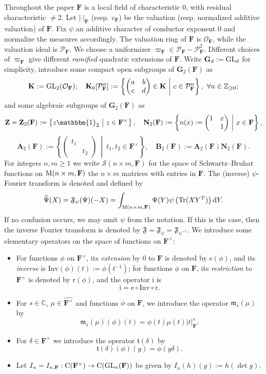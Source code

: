 \documentclass[A4]{amsart}
\def\geq{\geqslant}
\numberwithin{equation}{section} \everymath{\displaystyle}
\newcommand{\Cont}{{\rm C}}
\newcommand{\Sch}{\mathcal{S}}
\newcommand{\Tr}{{\rm Tr}}
\newcommand{\gp}[1]{\mathbf{#1}}
\newcommand{\GL}{{\rm GL}}
\newcommand{\Z}{\mathbb{Z}}
\newcommand{\Mat}{{\rm M}}
\newcommand{\id}{\mathbbm{1}}
\newcommand{\ud}{\mathrm{d}}
\newcommand{\C}{\mathbb{C}}
\newcommand{\F}{\mathbf{F}}
\newcommand{\vO}{\mathcal{O}}
\newcommand{\vP}{\mathcal{P}}
\newcommand{\norm}[1][\cdot]{\lvert #1 \rvert}
\newcommand{\OFour}{\mathfrak{F}}
\newcommand{\invOFour}{\overline{\mathfrak{F}}}
\newcommand{\Rem}{\mathrm{r}}
\newcommand{\Ext}{\mathrm{e}}
\newcommand{\Inv}{\mathrm{i}}
\newcommand{\Mult}{\mathfrak{m}}
\newcommand{\Trans}{\mathfrak{t}}
\begin{document}
	Throughout the paper $\F$ is a local field of characteristic $0$, with residual characteristic $\neq 2$. Let $\norm_{\F}$ (resp. $v_{\F}$) be the valuation (resp. normalized additive valuation) of $\F$. Fix $\psi$ an additive character of conductor exponent $0$ and normalize the measures accordingly. The valuation ring of $\F$ is $\vO_{\F}$, while the valuation ideal is $\vP_{\F}$. We choose a uniformizer $\varpi_{\F} \in \vP_{\F}-\vP_{\F}^2$. Different choices of $\varpi_{\F}$ give different \emph{ramified} quadratic extensions of $\F$. Write $\gp{G}_d := \GL_d$ for simplicity, introduce some compact open subgroups of $\gp{G}_2(\F)$ as
	$$ \gp{K} := \GL_2(\vO_{\F}); \quad \gp{K}_0[\vP_{\F}^n] := \left\{ \begin{pmatrix} a & b \\ c & d \end{pmatrix} \in \gp{K} \ \middle| \ c \in \vP_{\F}^n \right\}, \ \forall n \in \Z_{\geq 0}; $$
	and some algebraic subgroups of $\gp{G}_2(\F)$ as
	$$ \gp{Z} = \gp{Z}_2(\F) := \left\{ z \id_2 \ \middle| \ z \in \F^{\times} \right\}, \quad  \gp{N}_2(\F) := \left\{ n(x) := \begin{pmatrix} 1 & x \\ & 1 \end{pmatrix} \ \middle| \ x \in \F \right\}, $$
	$$ \gp{A}_2(\F) := \left\{ \begin{pmatrix} t_1 & \\ & t_2 \end{pmatrix} \ \middle| \ t_1,t_2 \in \F^{\times} \right\}, \quad \gp{B}_2(\F) := \gp{A}_2(\F) \gp{N}_2(\F). $$
	For integers $n,m \geq 1$ we write $\Sch(n \times m, \F)$ for the space of Schwartz--Bruhat functions on $\Mat(n \times m, \F)$ the $n \times m$ matrices with entries in $\F$. The (inverse) $\psi$-Fourier transform is denoted and defined by
	$$ \widehat{\Psi}(X) = \OFour_{\psi}(\Psi)(-X) = \int_{\Mat(n \times m, \F)} \Psi(Y) \psi \left( \Tr(XY^T) \right) \ud Y. $$
	If no confusion occurs, we may omit $\psi$ from the notation. If this is the case, then the inverse Fourier transform is denoted by $\invOFour = \OFour_{\overline{\psi}} = \OFour_{\psi^{-1}}$. We introduce some elementary operators on the space of functions on $\F^{\times}$:
\begin{itemize}
	\item For functions $\phi$ on $\F^{\times}$, its \emph{extension} by $0$ to $\F$ is denoted by $\Ext(\phi)$, and its \emph{inverse} is $\mathrm{Inv}(\phi)(t) := \phi(t^{-1})$; for functions $\phi$ on $\F$, its \emph{restriction} to $\F^{\times}$ is denoted by $\Rem(\phi)$, and the operator $\Inv$ is 
	$$ \Inv = \Ext \circ \mathrm{Inv} \circ \Rem. $$
	\item For $s \in \C$, $\mu \in \widehat{\F^{\times}}$ and functions $\phi$ on $\F$, we introduce the operator $\Mult_s(\mu)$ by
	$$ \Mult_s(\mu)(\phi)(t) = \phi(t) \mu(t) \norm[t]_{\F}^s. $$
	\item For $\delta \in \F^{\times}$ we introduce the operator $\Trans(\delta)$ by
	$$ \Trans(\delta)(\phi)(y) = \phi(y \delta). $$
	\item Let $I_n = I_{n,\F}: \Cont(\F^{\times}) \to \Cont(\GL_n(\F))$ be given by $I_n(h)(g) := h(\det g)$.
\end{itemize}
\end{document}
